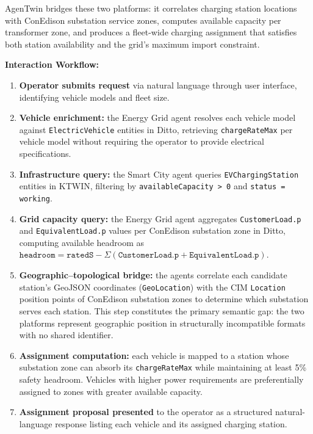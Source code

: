 AgenTwin bridges these two platforms:
    it correlates charging station locations with ConEdison substation service zones,
    computes available capacity per transformer zone,
    and produces a fleet-wide charging assignment that satisfies both
    station availability and the grid's maximum import constraint.

\textbf{Interaction Workflow:}
\begin{enumerate}
    \item \textbf{Operator submits request} via natural language through user interface,
        identifying vehicle models and fleet size.
    \item \textbf{Vehicle enrichment:} the Energy Grid agent resolves each vehicle model against
        \texttt{ElectricVehicle} entities in Ditto,
        retrieving \texttt{chargeRateMax} per vehicle model without requiring
        the operator to provide electrical specifications.
    \item \textbf{Infrastructure query:} the Smart City agent queries \texttt{EVChargingStation}
        entities in KTWIN, filtering by
        \texttt{availableCapacity > 0} and
        \texttt{status = working}.
    \item \textbf{Grid capacity query:} the Energy Grid agent aggregates
        \texttt{CustomerLoad.p} and \texttt{EquivalentLoad.p} values
        per ConEdison substation zone in Ditto,
        computing available headroom as
        $\texttt{headroom} = \texttt{ratedS} - \Sigma(\texttt{CustomerLoad.p} + \texttt{EquivalentLoad.p})$.
    \item \textbf{Geographic--topological bridge:} the agents correlate each candidate station's
        GeoJSON coordinates (\texttt{GeoLocation}) with the CIM \texttt{Location} position points
        of ConEdison substation zones to determine which substation serves each station.
        This step constitutes the primary semantic gap: the two platforms
        represent geographic position in structurally incompatible formats with no shared identifier.
    \item \textbf{Assignment computation:} each vehicle is mapped to a station whose substation zone
        can absorb its \texttt{chargeRateMax} while maintaining at least 5\% safety headroom.
        Vehicles with higher power requirements are preferentially assigned to zones
        with greater available capacity.
    \item \textbf{Assignment proposal presented} to the operator as a structured natural-language
        response listing each vehicle and its assigned charging station.
\end{enumerate}

